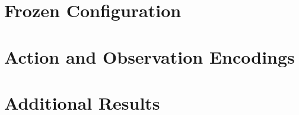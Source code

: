
\chapter{Frozen Configuration}\label{app:configuration}


\chapter{Action and Observation Encodings}\label{app:encodings}


\chapter{Additional Results}\label{app:results}

